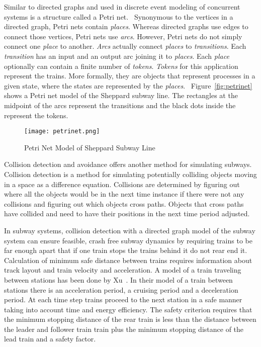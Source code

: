 Similar to directed graphs and used in discrete event modeling of concurrent
systems is a structure called a Petri net.~\cite{Petri62}  Synonymous to the
vertices in a directed graph, Petri nets contain \textit{places}.  Whereas
directed graphs use edges to connect those vertices, Petri nets use
\textit{arcs}. However, Petri nets do not simply connect one \textit{place} to
another.  \textit{Arcs} actually connect \textit{places} to
\textit{transitions}. Each \textit{transition} has an input and an output arc
joining it to \textit{places}.  Each \textit{place} optionally can contain a
finite number of \textit{tokens}.  \textit{Tokens} for this application
represent the trains.  More formally, they are objects that represent processes
in a given state, where the states are represented by the
\textit{places}.~\cite{Kristoffersen2003}  Figure~\ref{fig:petrinet} shows a
Petri net model of the Sheppard subway line. The rectangles at the midpoint of
the arcs represent the transitions and the black dots inside the represent the
tokens.

\begin{figure}[htb]
	\centering
	\texttt{[image: petrinet.png]}
	\caption{Petri Net Model of Sheppard Subway Line}
	\label{fig:directedgraph}
\end{figure}

Collision detection and avoidance offers another method for simulating subways.
Collision detection is a method for simulating potentially colliding objects
moving in a space as a difference equation. Collisions are determined by
figuring out where all the objects would be in the next time instance if there
were not any collisions and figuring out which objects cross paths. Objects that
cross paths have collided and need to have their positions in the next time
period adjusted.

In subway systems, collision detection with a directed graph model of the subway
system can ensure feasible, crash free subway dynamics by requiring trains to be
far enough apart that if one train stops the trains behind it do not rear end
it. Calculation of minimum safe distance between trains requires information
about track layout and train velocity and acceleration. A model of a train
traveling between stations has been done by Xu~\cite{Xu2014}. In their model of
a train between stations there is an acceleration period, a cruising period and
a deceleration period. At each time step trains proceed to the next station in a
safe manner taking into account time and energy efficiency. The safety criterion
requires that the minimum stopping distance of the rear train is less than the
distance between the leader and follower train train plus the minimum stopping
distance of the lead train and a safety factor. 

